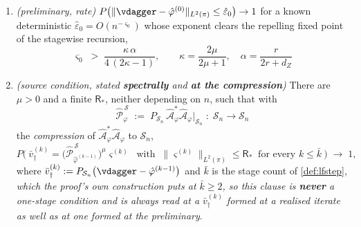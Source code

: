 \begin{proposition}
\begin{enumerate}
\begin{enumerate}
\item[(P-a.2)] \emph{(preliminary, rate)} $P\big(\|\vdagger-\hat\varphi^{(0)}\|_{L^{2}(\pi)}\le\hat\varepsilon_0\big)\to1$
for a known deterministic $\hat\varepsilon_0=O(n^{-\varsigma_0})$ whose exponent clears the repelling
fixed point of the stagewise recursion,
\[
\varsigma_0\;>\;\frac{\kappa\,\alpha}{4\,(2\kappa-1)},
\qquad \kappa=\frac{2\mu}{2\mu+1},\quad\alpha=\frac{r}{2r+d_Z}
\]
\item[(P-a.3)] \emph{(source condition, stated \textbf{spectrally} and \textbf{at the compression})}
There are $\mu>0$ and a finite $\mathsf R_\ast$, neither depending on $n$, such that with
\begin{equation}\label{eq:compress}
\hat{\mathcal P}^{\,\mathcal S}_{\varphi}\;:=\;P_{\mathcal S_n}\,\hat{\mathcal A}^{\ast}_{\varphi}\hat{\mathcal A}_{\varphi}\big\vert_{\mathcal S_n}
\;:\;\mathcal S_n\to\mathcal S_n
\end{equation}
the \emph{compression} of $\hat{\mathcal A}^{\ast}_{\varphi}\hat{\mathcal A}_{\varphi}$ to
$\mathcal S_n$,
\[
P\Big(\ \bar v^{(k)}_\dagger=\big(\hat{\mathcal P}^{\,\mathcal S}_{\hat\varphi^{(k-1)}}\big)^{\mu}\varsigma^{(k)}
\ \text{ with }\ \big\|\varsigma^{(k)}\big\|_{L^{2}(\pi)}\le\mathsf R_\ast
\ \text{ for every }k\le\bar k\ \Big)\;\longrightarrow\;1 ,
\]
where $\bar v^{(k)}_\dagger:=P_{\mathcal S_n}\big(\vdagger-\hat\varphi^{(k-1)}\big)$ and $\bar k$ is the
stage count of \cref{def:lfstep}, \emph{which the proof's own construction puts at $\bar k\ge2$, so this
clause is \textbf{never} a one-stage condition and is always read at a $\bar v^{(k)}_\dagger$ formed at a
realised iterate as well as at one formed at the preliminary}.
\end{enumerate}

\end{enumerate}
\end{proposition}
